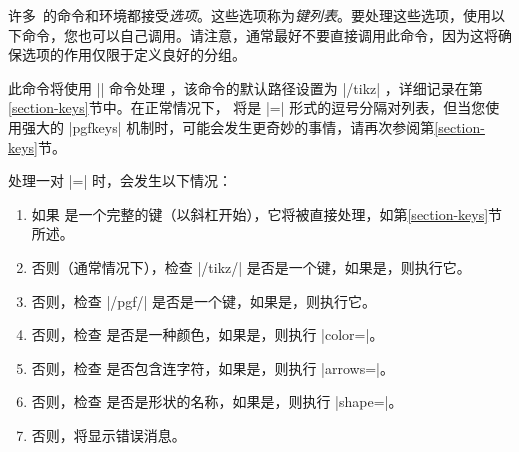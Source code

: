许多\tikzname\ 的命令和环境都接受\emph{选项}。这些选项称为\emph{键列表}。要处理这些选项，使用以下命令，您也可以自己调用。请注意，通常最好不要直接调用此命令，因为这将确保选项的作用仅限于定义良好的分组。

\begin{command}{\tikzset{}}

    此命令将使用 |\pgfkeys| 命令处理 ，该命令的默认路径设置为 |/tikz| ，详细记录在第\ref{section-keys}节中。在正常情况下， 将是 |=| 形式的逗号分隔对列表，但当您使用强大的 |pgfkeys| 机制时，可能会发生更奇妙的事情，请再次参阅第\ref{section-keys}节。


    处理一对 |=| 时，会发生以下情况：
    \begin{enumerate}
        \item 如果  是一个完整的键（以斜杠开始），它将被直接处理，如第\ref{section-keys}节所述。
        \item 否则（通常情况下），检查 |/tikz/| 是否是一个键，如果是，则执行它。
        \item 否则，检查 |/pgf/| 是否是一个键，如果是，则执行它。
        \item 否则，检查  是否是一种颜色，如果是，则执行 |color=|。
        \item 否则，检查  是否包含连字符，如果是，则执行 |arrows=|。
        \item 否则，检查  是否是形状的名称，如果是，则执行 |shape=|。
        \item 否则，将显示错误消息。
    \end{enumerate}


\end{command}
